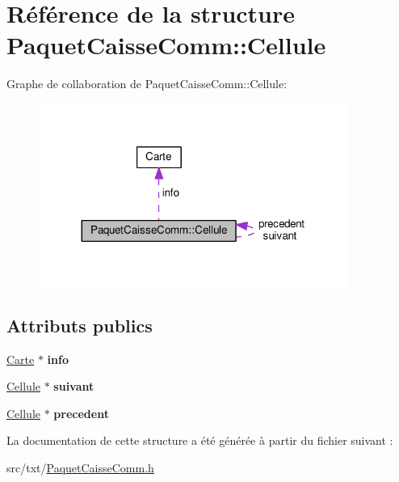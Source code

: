 \hypertarget{structPaquetCaisseComm_1_1Cellule}{}\section{Référence de la structure Paquet\+Caisse\+Comm\+:\+:Cellule}
\label{structPaquetCaisseComm_1_1Cellule}


Graphe de collaboration de Paquet\+Caisse\+Comm\+:\+:Cellule\+:
\nopagebreak
\begin{figure}[H]
\begin{center}
\leavevmode
\includegraphics[width=287pt]{structPaquetCaisseComm_1_1Cellule__coll__graph}
\end{center}
\end{figure}
\subsection*{Attributs publics}
\begin{DoxyCompactItemize}
\item 
\hyperlink{classCarte}{Carte} $\ast$ {\bfseries info}\hypertarget{structPaquetCaisseComm_1_1Cellule_a2daf292d52bc4be1c5f9b21e5ca62a70}{}\label{structPaquetCaisseComm_1_1Cellule_a2daf292d52bc4be1c5f9b21e5ca62a70}

\item 
\hyperlink{structPaquetCaisseComm_1_1Cellule}{Cellule} $\ast$ {\bfseries suivant}\hypertarget{structPaquetCaisseComm_1_1Cellule_a95717e932cf65ea9029dad23110de9c7}{}\label{structPaquetCaisseComm_1_1Cellule_a95717e932cf65ea9029dad23110de9c7}

\item 
\hyperlink{structPaquetCaisseComm_1_1Cellule}{Cellule} $\ast$ {\bfseries precedent}\hypertarget{structPaquetCaisseComm_1_1Cellule_af3b6d3460c1e11968739a1f6fb8d845f}{}\label{structPaquetCaisseComm_1_1Cellule_af3b6d3460c1e11968739a1f6fb8d845f}

\end{DoxyCompactItemize}


La documentation de cette structure a été générée à partir du fichier suivant \+:\begin{DoxyCompactItemize}
\item 
src/txt/\hyperlink{PaquetCaisseComm_8h}{Paquet\+Caisse\+Comm.\+h}\end{DoxyCompactItemize}
